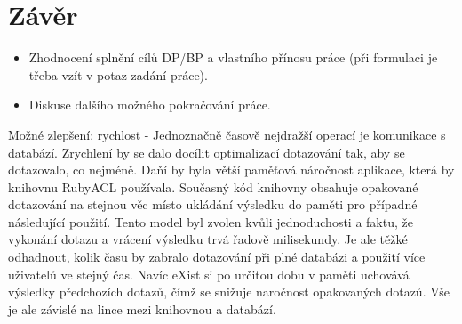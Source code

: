 \chapter{Závěr}

\begin{itemize}
\item Zhodnocení splnění cílů DP/BP a  vlastního přínosu práce (při formulaci je třeba vzít v potaz zadání práce).
\item Diskuse dalšího možného pokračování práce.
\end{itemize} 

Možné zlepšení: 
rychlost - Jednoznačně časově nejdražší operací je komunikace s databází. Zrychlení by se dalo docílit optimalizací dotazování tak, aby se dotazovalo, co nejméně. Daňí by byla větší paměťová náročnost aplikace, která by knihovnu RubyACL používala. Současný kód knihovny obsahuje opakované dotazování na stejnou věc místo ukládání výsledku do paměti pro případné následující použití. Tento model byl zvolen kvůli jednoduchosti a faktu, že vykonání dotazu a vrácení výsledku trvá řadově milisekundy. Je ale těžké odhadnout, kolik času by zabralo dotazování při plné databázi a použití více uživatelů ve stejný čas. Navíc eXist si po určitou dobu v paměti uchovává výsledky předchozích dotazů, čímž se snižuje naročnost opakovaných dotazů. Vše je ale závislé na lince mezi knihovnou a databází.